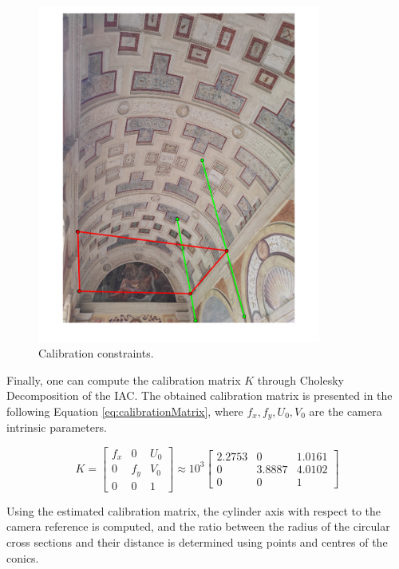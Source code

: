\documentclass[12pt,a4paper]{article}
\begin{document}
\begin{figure}[H]
    \centering
    \includegraphics[width=0.83\textwidth]{Images/PalazzoTe_IAC_constraints.png}
    \caption[Calibration constraints.]{Calibration constraints.}
    \label{fig:calibConstraints}
\end{figure}

Finally, one can compute the calibration matrix $K$ through Cholesky Decomposition of the IAC. The obtained calibration matrix is presented in the following Equation \ref{eq:calibrationMatrix}, where $f_x,f_y,U_0,V_0$ are the camera intrinsic parameters.

\begin{equation}
    K =
    \begin{bmatrix}
    f_x & 0 & U_0\\
    0 & f_y & V_0\\
    0 & 0 & 1
    \end{bmatrix}
    \approx 10^3
    \begin{bmatrix}
    2.2753 & 0 & 1.0161\\
    0 & 3.8887 & 4.0102\\
    0 & 0 & 1
    \end{bmatrix}
    \label{eq:calibrationMatrix}
\end{equation}
\bigskip

Using the estimated calibration matrix, the cylinder axis with respect to the camera reference is computed, and the ratio between the radius of the circular cross sections and their distance is determined using points and centres of the conics.
\end{document}
